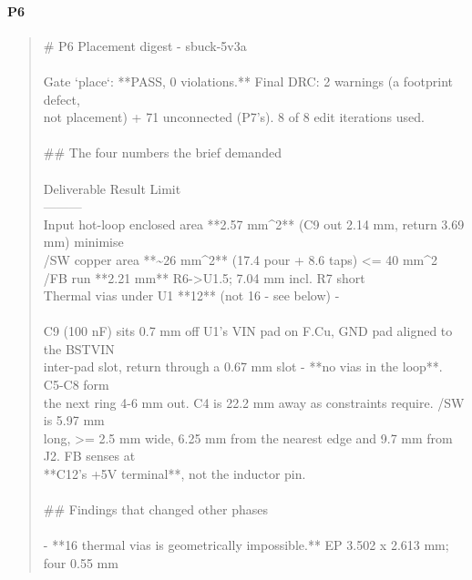 \documentclass[11pt,a4paper]{article}
\begin{document}
\paragraph*{P6}
\begin{quote}\small\ttfamily\raggedright
\# P6 Placement digest - sbuck-5v3a\\
~\\
Gate `place`: {*}{*}PASS, 0 violations.{*}{*} Final DRC: 2 warnings (a footprint defect,\\
not placement) + 71 unconnected (P7's). 8 of 8 edit iterations used.\\
~\\
\#\# The four numbers the brief demanded\\
~\\
\textbar{} Deliverable \textbar{} Result \textbar{} Limit \textbar{}\\
\textbar{}---\textbar{}---\textbar{}---\textbar{}\\
\textbar{} Input hot-loop enclosed area \textbar{} {*}{*}2.57 mm\textasciicircum{}2{*}{*} (C9 out 2.14 mm, return 3.69 mm) \textbar{} minimise \textbar{}\\
\textbar{} /SW copper area \textbar{} {*}{*}\textasciitilde{}26 mm\textasciicircum{}2{*}{*} (17.4 pour + 8.6 taps) \textbar{} \textless{}= 40 mm\textasciicircum{}2 \textbar{}\\
\textbar{} /FB run \textbar{} {*}{*}2.21 mm{*}{*} R6-\textgreater{}U1.5; 7.04 mm incl. R7 \textbar{} short \textbar{}\\
\textbar{} Thermal vias under U1 \textbar{} {*}{*}12{*}{*} (not 16 - see below) \textbar{} - \textbar{}\\
~\\
C9 (100 nF) sits 0.7 mm off U1's VIN pad on F.Cu, GND pad aligned to the BST\textbar{}VIN\\
inter-pad slot, return through a 0.67 mm slot - {*}{*}no vias in the loop{*}{*}. C5-C8 form\\
the next ring 4-6 mm out. C4 is 22.2 mm away as constraints require. /SW is 5.97 mm\\
long, \textgreater{}= 2.5 mm wide, 6.25 mm from the nearest edge and 9.7 mm from J2. FB senses at\\
{*}{*}C12's +5V terminal{*}{*}, not the inductor pin.\\
~\\
\#\# Findings that changed other phases\\
~\\
- {*}{*}16 thermal vias is geometrically impossible.{*}{*} EP 3.502 x 2.613 mm; four 0.55 mm\\

\end{quote}
\end{document}

